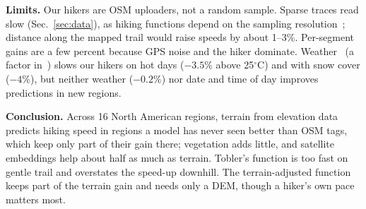 \textbf{Limits.} Our hikers are OSM uploaders, not a random sample. Sparse
traces read slow (Sec.~\ref{sec:data}), as hiking functions depend on the
sampling resolution~\cite{goodwin2025application}; distance along the
mapped trail would raise speeds by about 1--3\%. Per-segment gains are a
few percent because GPS noise and the hiker dominate.
Weather~\cite{thornton2022daymet} (a factor in~\cite{huang2026modeling})
slows our hikers on hot days ($-3.5\%$
above 25$^\circ$C) and with snow cover ($-4\%$), but neither weather
($-0.2\%$) nor date and time of day improves predictions in new regions.

\textbf{Conclusion.} Across 16 North American regions, terrain from
elevation data predicts hiking speed in regions a model has never seen
better than OSM tags, which keep only part of their gain there; vegetation
adds little, and satellite embeddings help about half as much as
terrain. Tobler's function is too fast on gentle trail and overstates the
speed-up downhill. The terrain-adjusted function keeps part of the terrain
gain and needs only a DEM, though a hiker's own pace matters most.
